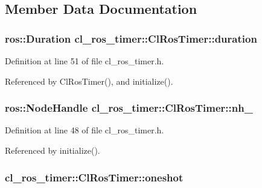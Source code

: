 \subsection{Member Data Documentation}
\subsubsection[{\texorpdfstring{duration}{duration}}]{\setlength{\rightskip}{0pt plus 5cm}ros\+::\+Duration cl\+\_\+ros\+\_\+timer\+::\+Cl\+Ros\+Timer\+::duration\hspace{0.3cm}{\ttfamily [protected]}}\hypertarget{classcl__ros__timer_1_1ClRosTimer_a39a5666044409eca94562fcceca8b0ea}{}\label{classcl__ros__timer_1_1ClRosTimer_a39a5666044409eca94562fcceca8b0ea}


Definition at line 51 of file cl\+\_\+ros\+\_\+timer.\+h.



Referenced by Cl\+Ros\+Timer(), and initialize().

\subsubsection[{\texorpdfstring{nh\+\_\+}{nh_}}]{\setlength{\rightskip}{0pt plus 5cm}ros\+::\+Node\+Handle cl\+\_\+ros\+\_\+timer\+::\+Cl\+Ros\+Timer\+::nh\+\_\+\hspace{0.3cm}{\ttfamily [protected]}}\hypertarget{classcl__ros__timer_1_1ClRosTimer_a37b156a2fc18f04891aa4cb63c8d41b9}{}\label{classcl__ros__timer_1_1ClRosTimer_a37b156a2fc18f04891aa4cb63c8d41b9}


Definition at line 48 of file cl\+\_\+ros\+\_\+timer.\+h.



Referenced by initialize().

\subsubsection[{\texorpdfstring{oneshot}{oneshot}}]{ cl\+\_\+ros\+\_\+timer\+::\+Cl\+Ros\+Timer\+::oneshot\hspace{0.3cm}{\ttfamily [protected]}}\hypertarget{classcl__ros__timer_1_1ClRosTimer_a07ce4ac2560aa7ad4b5dee233f2d7733}{}\label{classcl__ros__timer_1_1ClRosTimer_a07ce4ac2560aa7ad4b5dee233f2d7733}


